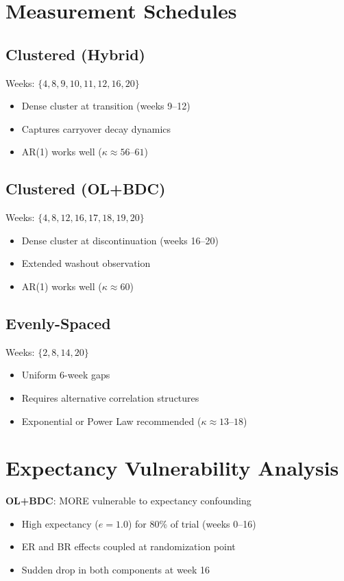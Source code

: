 \documentclass[11pt]{article}
\theoremstyle{definition}
\begin{document}
\section{Measurement Schedules}

\subsection{Clustered (Hybrid)}

Weeks: $\{4, 8, 9, 10, 11, 12, 16, 20\}$
\begin{itemize}
    \item Dense cluster at transition (weeks 9--12)
    \item Captures carryover decay dynamics
    \item AR(1) works well ($\kappa \approx 56$--$61$)
\end{itemize}

\subsection{Clustered (OL+BDC)}

Weeks: $\{4, 8, 12, 16, 17, 18, 19, 20\}$
\begin{itemize}
    \item Dense cluster at discontinuation (weeks 16--20)
    \item Extended washout observation
    \item AR(1) works well ($\kappa \approx 60$)
\end{itemize}

\subsection{Evenly-Spaced}

Weeks: $\{2, 8, 14, 20\}$
\begin{itemize}
    \item Uniform 6-week gaps
    \item Requires alternative correlation structures
    \item Exponential or Power Law recommended ($\kappa \approx 13$--$18$)
\end{itemize}

\section{Expectancy Vulnerability Analysis}

\textbf{OL+BDC}: MORE vulnerable to expectancy confounding
\begin{itemize}
    \item High expectancy ($e=1.0$) for 80\% of trial (weeks 0--16)
    \item ER and BR effects coupled at randomization point
    \item Sudden drop in both components at week 16
\end{itemize}
\end{document}
